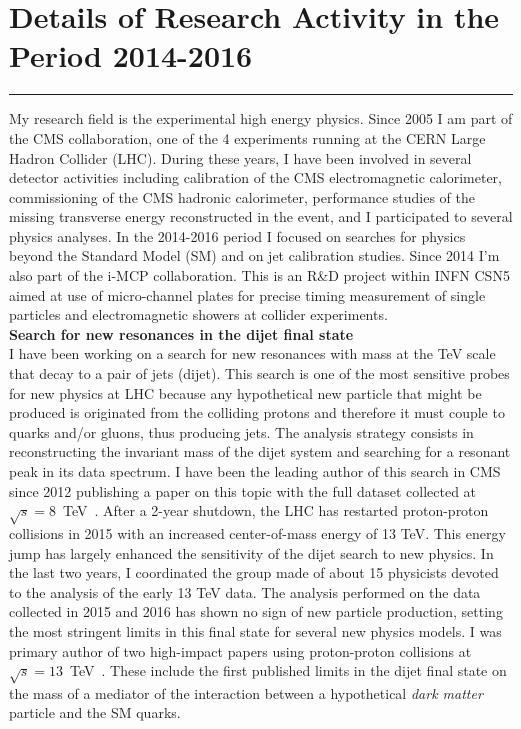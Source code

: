 \documentclass[10pt, a4paper]{article}
\begin{document}
\section*{Details of Research Activity in the Period 2014-2016}
\vspace{-5pt}
\hrule
\vspace{10pt}
My research field is the experimental high energy physics. Since 2005
I am part of the CMS collaboration, one of the 4 experiments running at
the CERN Large Hadron Collider (LHC). During these years, I have been
involved in several detector activities including calibration of the
CMS electromagnetic calorimeter, commissioning of the CMS hadronic
calorimeter, performance studies of the missing transverse energy
reconstructed in the event, and I participated to several physics analyses.
In the 2014-2016 period I focused on searches for physics beyond the
Standard Model (SM) and on jet calibration studies. 
Since 2014 I'm also part of the i-MCP collaboration. This is
an R\&D project within INFN CSN5 aimed at use of micro-channel plates for
precise timing measurement of single particles and electromagnetic showers
at collider experiments. \\[1em]

{\bf Search for new resonances in the dijet final state}\\[0.5em]
I have been working on a search for new resonances with mass at the TeV
scale that decay to a pair of jets (dijet). This search is one of the most 
sensitive probes for new physics at LHC because any hypothetical new
particle that might be produced is originated from the
colliding protons and therefore it must couple to quarks and/or
gluons, thus producing jets. The analysis strategy consists in
reconstructing the invariant mass of the dijet system and searching for a
resonant peak in its data spectrum. I have been the leading author of this
search in CMS since 2012 publishing a paper on this topic with the
full dataset collected at $\sqrt{s}=8$~TeV~\cite{Khachatryan:2015sja}. After a 2-year
shutdown, the LHC has restarted proton-proton collisions in 2015 with an increased 
center-of-mass energy of 13 TeV. This energy jump has largely enhanced the
sensitivity of the dijet search to new physics. In the last two years, 
I coordinated the group
made of about 15 physicists devoted to the
analysis of the early 13 TeV data. The analysis performed on the data
collected in 2015 and 2016 has shown no sign of new particle
production, setting the most stringent limits in this final state 
for several new physics models. 
I was primary author of two high-impact papers using proton-proton
collisions at
$\sqrt{s}=13$~TeV~\cite{Sirunyan:2016iap,Khachatryan:2015dcf}.
These include the first published limits in the dijet final state on the
mass of a mediator of the interaction between a hypothetical 
{\it dark matter} particle and the SM quarks. \\[1em]
\end{document}
